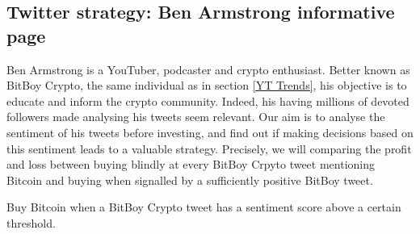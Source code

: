 \documentclass[twoside]{report}
\begin{document}
\begin{spacing}{1}
\subsection{Twitter strategy: Ben Armstrong informative page}
Ben Armstrong is a YouTuber, podcaster and crypto enthusiast. Better known as BitBoy Crypto, the same individual as in section \ref{YT Trends}, his objective is to educate and inform the crypto community. Indeed, his having millions of devoted followers made analysing his tweets seem relevant. Our aim is to analyse the sentiment of his tweets before investing, and find out if making decisions based on this sentiment leads to a valuable strategy. Precisely, we will comparing the profit and loss between buying blindly at every BitBoy Crpyto tweet mentioning Bitcoin and buying when signalled by a sufficiently positive BitBoy tweet. 
\begin{strategy}
Buy Bitcoin when a BitBoy Crypto tweet has a sentiment score above a certain threshold.  
\end{strategy}\label{strat:sent} 
\begin{figure}[!h]
\begin{minipage}{.5\linewidth}
\centering
{}
\end{minipage}%
\begin{minipage}{.5\linewidth}
\centering

\end{minipage}
\end{figure}
\end{spacing}
\end{document}
